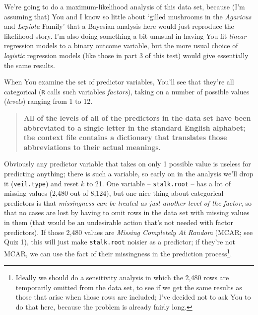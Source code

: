\documentclass[12pt]{article}
\begin{document}
We're going to do a maximum-likelihood analysis of this data set, because (I'm assuming that) You and I know so little about `gilled mushrooms in the \textit{Agaricus} and \textit{Lepiota} Family' that a Bayesian analysis here would just reproduce the likelihood story. I'm also doing something a bit unusual in having You fit \textit{linear} regression models to a binary outcome variable, but the more usual choice of \textit{logistic} regression models (like those in part 3 of this test) would give essentially the same results.

When You examine the set of predictor variables, You'll see that they're all categorical (\texttt{R} calls such variables \textit{factors}), taking on a number of possible values (\textit{levels}) ranging from 1 to 12. 

\begin{quote}

\textbf{ \vspace*{0.025in} All of the levels of all of the predictors in the data set have been abbreviated to a single letter in the standard English alphabet; the context file contains a dictionary that translates those abbreviations to their actual meanings.} 

\end{quote}

Obviously any predictor variable that takes on only 1 possible value is useless for predicting anything; there is such a variable, so early on in the analysis we'll drop it (\texttt{veil.type}) and reset $k$ to 21. One variable -- \texttt{stalk.root} -- has a lot of missing values (2,480 out of 8,124), but one nice thing about categorical predictors is that \textit{missingness can be treated as just another level of the factor}, so that no cases are lost by having to omit rows in the data set with missing values in them (that would be an undesirable action that's not needed with factor predictors). If those 2,480 values are \textit{Missing Completely At Random} (MCAR; see Quiz 1), this will just make 
\texttt{stalk.root} noisier as a predictor; if they're not MCAR, we can use the fact of their missingness in the prediction process\footnote{Ideally we should do a sensitivity analysis in which the 2,480 rows are temporarily omitted from the data set, to see if we get the same results as those that arise when those rows are included; I've decided not to ask You to do that here, because the problem is already fairly long.}.
\end{document}

